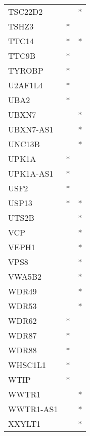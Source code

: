 \begin{longtable}{lcc}
TSC22D2          &                &          * \\
TSHZ3            &              * &            \\
TTC14            &              * &          * \\
TTC9B            &              * &            \\
TYROBP           &              * &            \\
U2AF1L4          &              * &            \\
UBA2             &              * &            \\
UBXN7            &                &          * \\
UBXN7-AS1        &                &          * \\
UNC13B           &                &          * \\
UPK1A            &              * &            \\
UPK1A-AS1        &              * &            \\
USF2             &              * &            \\
USP13            &              * &          * \\
UTS2B            &                &          * \\
VCP              &                &          * \\
VEPH1            &                &          * \\
VPS8             &                &          * \\
VWA5B2           &                &          * \\
WDR49            &                &          * \\
WDR53            &                &          * \\
WDR62            &              * &            \\
WDR87            &              * &            \\
WDR88            &              * &            \\
WHSC1L1          &              * &            \\
WTIP             &              * &            \\
WWTR1            &                &          * \\
WWTR1-AS1        &                &          * \\
XXYLT1           &                &          * \\

\end{longtable}
